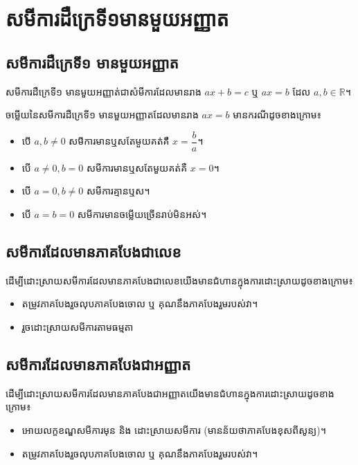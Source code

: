\chapter{សមីការដឺក្រេទី១មានមួយអញ្ញាត}

\section{សមីការដឺក្រេទី១ មានមួយអញ្ញាត}
\begin{definition}
សមីការដឺក្រេទី១ មានមួយអញ្ញាត់ជាសំមីការដែលមានរាង $ax+b=c$ ឬ $ax=b$ ដែល $a,b\in \mathbb{R}$។
\end{definition}

\begin{general}
ចម្លើយនៃសមីការដឺក្រេទី១ មានមួយអញ្ញាតដែលមានរាង $ax=b$ មានករណីដូចខាងក្រោម៖
\begin{itemize}
\item បើ $a,b\ne 0$ សមីការមានឬសតែមួយគត់គឺ $x=\dfrac{b}{a}$។
\item បើ $a\ne 0, b=0$ សមីការមានឬសតែមួយគត់គឺ $x=0$។
\item បើ $a=0,b\ne 0$ សមីការគ្មានឬស។
\item បើ $a=b=0$ សមីការមានចម្លើយច្រើនរាប់មិនអស់។
\end{itemize}
\end{general}
\section{សមីការដែលមានភាគបែងជាលេខ}
\begin{general}
ដើម្បីដោះស្រាយសមីការដែលមានភាគបែងជាលេខយើងមានជំហានក្នុងការដោះស្រាយដូចខាងក្រោម៖
\begin{itemize}
\item តម្រូវភាគបែងរួចលុបភាគបែងចោល ឬ គុណនឹងភាគបែងរួមរបស់វា។
\item រួចដោះស្រាយសមីការតាមធម្មតា
\end{itemize}
\end{general}
\section{សមីការដែលមានភាគបែងជាអញ្ញាត}
\begin{general}
ដើម្បីដោះស្រាយសមីការដែលមានភាគបែងជាអញ្ញាតយើងមានជំហានក្នុងការដោះស្រាយដូចខាងក្រោម៖
\begin{itemize}
\item អោយលក្ខខណ្ឌសមីការមុន និង ដោះស្រាយសមីការ (មានន័យថាភាគបែងខុសពីសូន្យ)។
\item តម្រូវភាគបែងរួចលុបភាគបែងចោល ឬ គុណនឹងភាគបែងរួមរបស់វា។
\end{itemize}
\end{general}
